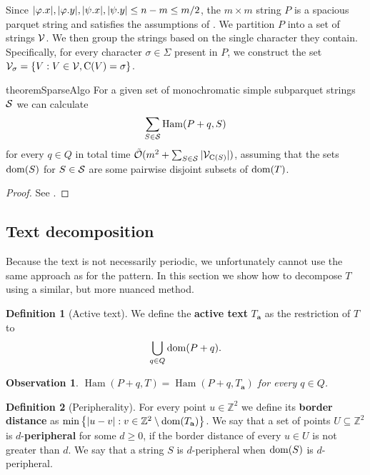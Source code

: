 \documentclass[11pt]{article}
\newcommand{\Z}{\mathbb{Z}}
\newcommand{\tO}{\tilde{\mathcal{O}}}
\renewcommand{\phi}{\varphi}
\newcommand{\set}[1]{\left\lbrace #1 \right\rbrace}
\theoremstyle{plain}
\newtheorem{observation}{Observation}
\theoremstyle{definition}
\newtheorem{definition}{Definition}
\theoremstyle{remark}
\DeclareMathOperator*{\Ham}{Ham}
\begin{document}
Since $|\x{\phi}|, |\y{\phi}|, |\x{\psi}|, |\y{\psi}| \le n - m \le m / 2$, the $m \times m$ string $P$ is a spacious parquet string and satisfies the assumptions of .
We partition $P$ into a set of strings $\V$.
We then group the strings based on the single character they contain.
Specifically, for every character $\sigma \in \Sigma$ present in $P$, we construct the set $\V_\sigma = \set{V : V \in \V, \getchar{V} = \sigma}$.

\begin{restatable*}{theorem}{SparseAlgo}\label{sparse_algo}
	For a given set of monochromatic simple subparquet strings $\S$ we can calculate
	\[ \sum_{S \in \S} \Ham(P + q, S) \]
	for every $q \in Q$ in total time $\tO(m^2 + \sum_{S \in \S} |\V_{\getchar{S}}|)$, assuming that the sets $\d{S}$ for $S \in \S$ are some pairwise disjoint subsets of $\d{T}$.
\end{restatable*}
\begin{proof} See . \end{proof}

\subsection{Text decomposition}
Because the text is not necessarily periodic, we unfortunately cannot use the same approach as for the pattern.
In this section we show how to decompose $T$ using a similar, but more nuanced method.


\newcommand{\Ta}{T_\mathbf{a}}
\begin{definition}[Active text]
	We define the \textbf{active text} $\Ta$ as the restriction of $T$ to
	\[ \bigcup_{q \in Q} \d{P + q}. \]
\end{definition}

\begin{observation}
	$\Ham(P + q, T) = \Ham(P + q, \Ta)$ for every $q \in Q$.
\end{observation}

\begin{definition}[Peripherality]
	For every point $u \in \Z^2$ we define its \textbf{border distance} as
	$\min\set{|u - v| : v \in \Z^2 \setminus \d{\Ta}} $.
	We say that a set of points $U \subseteq \Z^2$ is $d$-\textbf{peripheral} for some $d \ge 0$, if the border distance of every $u \in U$ is not greater than $d$.
	We say that a string $S$ is $d$-peripheral when $\d{S}$ is $d$-peripheral.
\end{definition}
\end{document}
